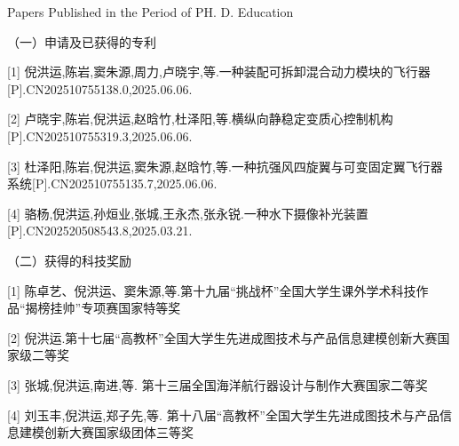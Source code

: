 
{}
 {Papers
Published in the Period of PH. D. Education}

（一）申请及已获得的专利

[1] 倪洪运,陈岩,窦朱源,周力,卢晓宇,等.一种装配可拆卸混合动力模块的飞行器[P].CN202510755138.0,2025.06.06.

[2] 卢晓宇,陈岩,倪洪运,赵晗竹,杜泽阳,等.横纵向静稳定变质心控制机构[P].CN202510755319.3,2025.06.06.

[3] 杜泽阳,陈岩,倪洪运,窦朱源,赵晗竹,等.一种抗强风四旋翼与可变固定翼飞行器系统[P].CN202510755135.7,2025.06.06.

[4] 骆杨,倪洪运,孙烜业,张城,王永杰,张永锐.一种水下摄像补光装置[P].CN202520508543.8,2025.03.21.

（二）获得的科技奖励

[1]	陈卓艺、倪洪运、窦朱源,等.第十九届“挑战杯”全国大学生课外学术科技作品“揭榜挂帅”专项赛国家特等奖

[2]	倪洪运.第十七届“高教杯”全国大学生先进成图技术与产品信息建模创新大赛国家级二等奖

[3]	张城,倪洪运,南进,等. 第十三届全国海洋航行器设计与制作大赛国家二等奖

[4]	刘玉丰,倪洪运,郑子先,等. 第十八届“高教杯”全国大学生先进成图技术与产品信息建模创新大赛国家级团体三等奖






